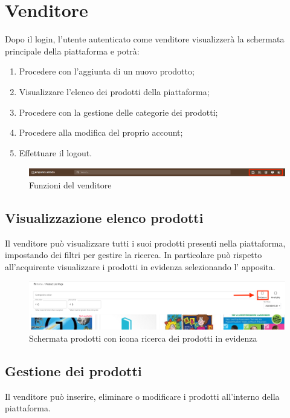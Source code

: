 \newpage
\section{Venditore}\label{Venditore}
Dopo il login, l'utente autenticato come venditore visualizzerà la schermata principale della piattaforma e potrà:
\begin{enumerate}
	\item Procedere con l'aggiunta di un nuovo prodotto;
	\item Visualizzare l'elenco dei prodotti della piattaforma;
	\item Procedere con la gestione delle categorie dei prodotti;
	\item Procedere alla modifica del proprio account;
	\item Effettuare il logout.
\end{enumerate}
\begin{figure}[H]
	\centering
	\includegraphics[scale=0.4]{Immagini/Venditore/Header.png}
	\caption{Funzioni del venditore}
	\label{fig:FunzioniVenditore}
\end{figure}
\subsection{Visualizzazione elenco prodotti}
Il venditore può visualizzare tutti i suoi prodotti presenti nella piattaforma, impostando dei filtri per gestire la ricerca. In particolare può rispetto all'acquirente visualizzare i prodotti in evidenza selezionando l' apposita.
\begin{figure}[H]
	\centering
	\includegraphics[scale=0.25]{Immagini/Venditore/plp.seller.png}
	\caption{Schermata prodotti con icona ricerca dei prodotti in evidenza}
	\label{fig:ProdottiEvidenza}
\end{figure}
\subsection{Gestione dei prodotti}
Il venditore può inserire, eliminare o modificare i prodotti all'interno della piattaforma.
